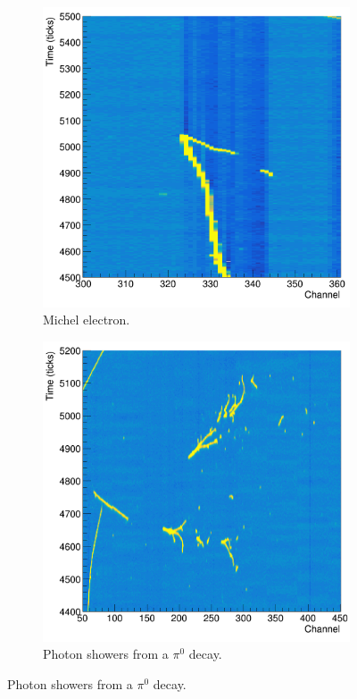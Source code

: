 \begin{figure}
	\begin{subfigure}[b]{0.49\textwidth}
		\vspace{5mm}
		\centering
		\includegraphics[width=\textwidth]{figures/michel_signature.png}
		\caption{Michel electron.}
		\label{fig:michel_signature}
	\end{subfigure}
	\hfill
	\begin{subfigure}[b]{0.49\textwidth}
		\vspace{5mm}
		\centering
		\includegraphics[width=\textwidth]{figures/pi0_signature.png}
		\caption{Photon showers from a $\pi^0$ decay.}
		\label{fig:pi0_signature}
	\end{subfigure}


\end{figure}
